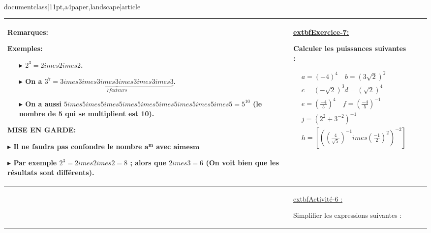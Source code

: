\\documentclass[11pt,a4paper,landscape]{article}
\begin{document}
\begin{longtable}{|>{\centering\arraybackslash}p{3cm}|>{\raggedright\arraybackslash}p{5cm}|>{\raggedright\arraybackslash}p{13.5cm}|>{\raggedright\arraybackslash}p{5cm}|}
\begin{BoxRafa}[colbacktitle = Orange]{Remarques:}
\end{BoxRafa}
\begin{BoxRafa}[colbacktitle = Orange]{Exemples:}

\begin{itemize}
\item[$\blacktriangleright$]  $2^{3}=2imes2imes2$.
\item[$\blacktriangleright$]  On a $3^7=\underbrace{3imes3imes3imes3imes3imes3imes3}_{7facteurs}$.
\item[$\blacktriangleright$]  On a aussi $5imes5imes5imes5imes5imes5imes5imes5imes5imes5=5^{10}$ (le nombre de 5 qui se multiplient est 10).
\end{itemize}

\end{BoxRafa}
\begin{BoxRafa}[colbacktitle = Orange]{MISE EN GARDE:}

$\blacktriangleright$ Il ne faudra pas confondre le nombre $\mathbf{a^{m}}$ avec $\mathbf{aimes m}$

$\blacktriangleright$ Par exemple $2^{3}=2imes2imes2=8$ ; alors que $2imes3=6$ (On voit bien que les résultats sont différents).


\end{BoxRafa}
&
\colorbox{yellow!50!white}{\uline{\sffamily extbf{Exercice-7:}}}\par
Calculer les puissances suivantes :

$\begin{aligned}
&a=\left(-4\right)^{4}\quad b=\left(3\sqrt{2}\right)^{2} \\
&c=\left(-\sqrt{2}\right)^{3}d=\left(\sqrt{2}\right)^{4} \\
&e=\left({\frac{-4}{5}}\right)^{4}\quad f=\left({\frac{-4}{5}}\right)^{-1} \\
&j=(2^{2}+3^{-2})^{-1} \\
&h=\left[((\frac{4}{\sqrt{5}})^{-1}imes(\frac{-1}{2})^{2})^{-2}\right]
\end{aligned}$
\\
\hline
&
\colorbox{yellow!50!white}{\uline{\sffamily extbf{Activité-6 :} }}\par%

Simplifier les expressions suivantes : 


\end{longtable}
\end{document}
